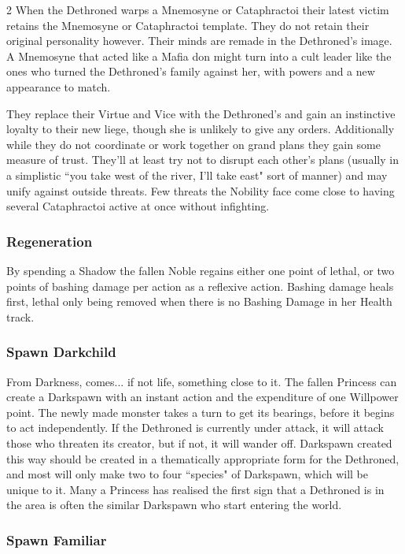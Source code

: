 \begin{multicols}{2}
When the Dethroned warps a Mnemosyne or Cataphractoi their latest victim retains the Mnemosyne or Cataphractoi template. They do not retain their original personality however. Their minds are remade in the Dethroned's image. A Mnemosyne that acted like a Mafia don might turn into a cult leader like the ones who turned the Dethroned's family against her, with powers and a new appearance to match.

They replace their Virtue and Vice with the Dethroned's and gain an instinctive loyalty to their new liege, though she is unlikely to give any orders. Additionally while they do not coordinate or work together on grand plans they gain some measure of trust. They'll at least try not to disrupt each other’s plans (usually in a simplistic \textquotedblleft you take west of the river, I'll take east" sort of manner) and may unify against outside threats. Few threats the Nobility face come close to having several Cataphractoi active at once without infighting.

\subsubsection*{Regeneration}

By spending a Shadow the fallen Noble regains either one point of lethal, or two points of bashing damage per action as a reflexive action. Bashing damage heals first, lethal only being removed when there is no Bashing Damage in her Health track.

\subsubsection*{Spawn Darkchild}

From Darkness, comes... if not life, something close to it. The fallen Princess can create a Darkspawn with an instant action and the expenditure of one Willpower point. The newly made monster takes a turn to get its bearings, before it begins to act independently. If the Dethroned is currently under attack, it will attack those who threaten its creator, but if not, it will wander off. Darkspawn created this way should be created in a thematically appropriate form for the Dethroned, and most will only make two to four \textquotedblleft species" of Darkspawn, which will be unique to it. Many a Princess has realised the first sign that a Dethroned is in the area is often the similar Darkspawn who start entering the world.

\subsubsection*{Spawn Familiar}


\end{multicols}
